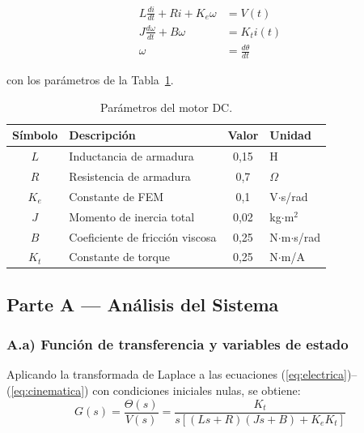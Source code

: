 \documentclass[12pt, a4paper]{article}
\begin{document}
\begin{align}
    L\frac{di}{dt} + Ri + K_e\omega &= V(t) \label{eq:electrica}\\
    J\frac{d\omega}{dt} + B\omega &= K_t i(t) \label{eq:mecanica}\\
    \omega &= \frac{d\theta}{dt} \label{eq:cinematica}
\end{align}

\noindent con los parámetros de la Tabla~\ref{tab:parametros}.

\begin{table}[H]
\centering
\caption{Parámetros del motor DC.}
\label{tab:parametros}
\begin{tabular}{@{}clcl@{}}
\toprule
\textbf{Símbolo} & \textbf{Descripción} & \textbf{Valor} & \textbf{Unidad} \\
\midrule
$L$   & Inductancia de armadura       & 0,15  & H \\
$R$   & Resistencia de armadura       & 0,7   & $\Omega$ \\
$K_e$ & Constante de FEM              & 0,1   & V$\cdot$s/rad \\
$J$   & Momento de inercia total      & 0,02  & kg$\cdot$m$^2$ \\
$B$   & Coeficiente de fricción viscosa & 0,25 & N$\cdot$m$\cdot$s/rad \\
$K_t$ & Constante de torque           & 0,25  & N$\cdot$m/A \\
\bottomrule
\end{tabular}
\end{table}

\subsection{Parte A — Análisis del Sistema}

\subsubsection{A.a) Función de transferencia y variables de estado}

Aplicando la transformada de Laplace a las ecuaciones (\ref{eq:electrica})--(\ref{eq:cinematica}) con condiciones iniciales nulas, se obtiene:
%
\begin{equation}
    G(s) = \frac{\Theta(s)}{V(s)} = \frac{K_t}{s\left[(Ls+R)(Js+B) + K_eK_t\right]}
\end{equation}
\end{document}
